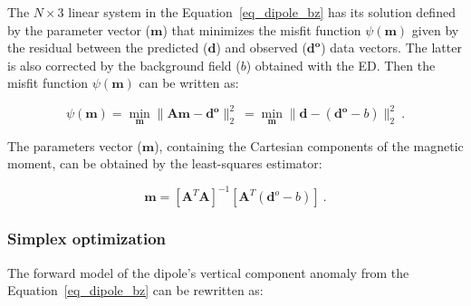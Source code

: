
    The $N \times 3$ linear system in the Equation~\ref{eq_dipole_bz} has its solution defined by the parameter vector ($\mathbf{m}$) that minimizes the misfit function $\psi(\mathbf{m})$ given by the residual between the predicted ($\mathbf{\mathbf{d}}$) and observed ($\mathbf{\mathbf{d}^o}$) data vectors. The latter is also corrected by the background field ($b$) obtained with the ED. Then the misfit function $\psi(\mathbf{m})$ can be written as:
   
    \begin{equation}
    \label{psi_function}
    \psi(\mathbf{m}) = \min_{\mathbf{m}} \| \mathbf{A}\mathbf{m} - \mathbf{\mathbf{d}^o} \|_2^2\ = \min_{\mathbf{m}} \| \mathbf{d} - (\mathbf{\mathbf{d}^o}-b) \|_2^2\
    .
    \end{equation}

    The parameters vector ($\mathbf{m}$), containing the Cartesian components of the magnetic moment, can be obtained by the least-squares estimator:

    \begin{equation}
    \label{dipole_moment_solution}
    \mathbf{m} = {[\mathbf{A}^T \mathbf{A}]}^{-1} [\mathbf{A}^T (\mathbf{d}^o - b)]\ .
    \end{equation}
        
\subsubsection{Simplex optimization} 
     The forward model of the dipole's vertical component anomaly from the Equation~\ref{eq_dipole_bz} can be rewritten as:

